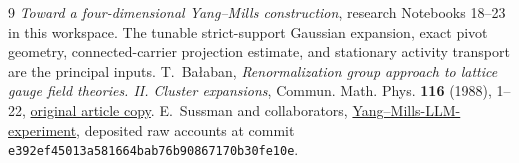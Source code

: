 
\begin{thebibliography}{9}
\emph{Toward a four-dimensional Yang--Mills construction},
research Notebooks 18--23 in this workspace.
The tunable strict-support Gaussian expansion, exact pivot
geometry, connected-carrier projection estimate, and
stationary activity transport are the principal inputs.
T.~Ba\l aban,
\emph{Renormalization group approach to lattice gauge field
theories. II. Cluster expansions},
Commun. Math. Phys. \textbf{116} (1988), 1--22,
\href{https://scispace.com/pdf/renormalization-group-approach-to-lattice-gauge-field-4penm4k7hc.pdf}{original article copy}.
E.~Sussman and collaborators,
\href{https://github.com/ethanwsussman/Yang--Mills-LLM-experiment}{Yang--Mills-LLM-experiment},
deposited raw accounts at commit
\texttt{e392ef45013a581664bab76b90867170b30fe10e}.
\end{thebibliography}


